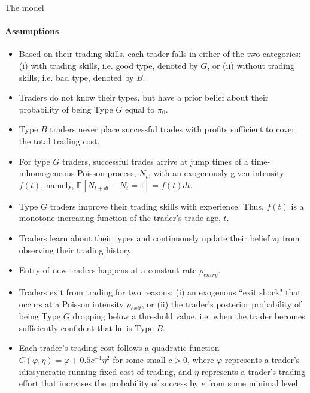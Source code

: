 \documentclass{beamer}
\begin{document}
\begin{frame}[allowframebreaks]{The model}
\framesubtitle{Assumptions}

\begin{itemize}
	
	\item Based on their trading skills, each trader falls in either of the two categories: (i) with trading skills, i.e. good type, denoted by $G$, or (ii) without trading skills, i.e. bad type, denoted by $B$. 
	
	\item Traders do not know their types, but have a prior belief about their probability of being Type $G$ equal to $\pi_0$.
	
	\item Type $B$ traders never place successful trades with profits sufficient to cover the total trading cost.
	
	\item For type $G$ traders, successful trades arrive at jump times of a time-inhomogeneous Poisson process, $N_t$, with an exogenously given intensity $f(t)$, namely, $\mathbb P[N_{t+dt}-N_t = 1] = f(t)dt$.
	
	\item Type $G$ traders improve their trading skills with experience. Thus, $f(t)$ is a monotone increasing function of the trader's trade age, $t$.
	
	\item Traders learn about their types and continuously update their belief $\pi_t$ from observing their trading history.
	
	\item Entry of new traders happens at a constant rate $\rho_{entry}$. 
	
	\item Traders exit from trading for two reasons: (i) an exogenous ``exit shock" that occurs at a Poisson intensity $\rho_{exit}$, or (ii) the trader's posterior probability of being Type $G$ dropping below a threshold value, i.e. when the trader becomes sufficiently confident that he is Type $B$.
	
	\item Each trader's trading cost follows a quadratic function $C(\varphi, \eta) =\varphi + 0.5 c^{-1} \eta^2$ for some small $c>0$, where  $\varphi$ represents a trader's idiosyncratic running fixed cost of trading, and $\eta$ represents a trader's trading effort that increases the probability of success by $e$ from some minimal level.
\end{itemize}
\end{frame}
\end{document}
